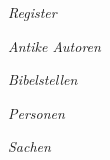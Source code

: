 \emptyEvenPage
\startpart[title={Register}]

\startsetups[b]
  \switchtobodyfont[default]
  \rlap{\pagenumber}
  \hfill
  {\tfx\it Register}
  \hfill
  \llap{}
\stopsetups

 \subject{Antike Autoren}
 
 \startsetups[a]
   \switchtobodyfont[default]
   \rlap{}
   \hfill
   {\tfx\it Antike Autoren}
   \hfill
   \llap{\pagenumber}
 \stopsetups
 
 {\startcolumns
 \placeantIndex
 \stopcolumns}
 
 
 \subject{Bibelstellen}
 
 \startsetups[a]
   \switchtobodyfont[default]
   \rlap{}
   \hfill
   {\tfx\it Bibelstellen}
   \hfill
   \llap{\pagenumber}
 \stopsetups
 
 \startcolumns
 \placebibelIndex
 \stopcolumns

 \subject{Personen}
 
 \startsetups[a]
   \switchtobodyfont[default]
   \rlap{}
   \hfill
   {\tfx\it Personen}
   \hfill
   \llap{\pagenumber}
 \stopsetups
 
 \startcolumns
 \placepersIndex
 \stopcolumns
 
 \subject{Sachen}
 
 \startsetups[a]
   \switchtobodyfont[default]
   \rlap{}
   \hfill
  {\tfx\it Sachen}
   \hfill
   \llap{\pagenumber}
 \stopsetups

 {\startcolumns
 \placesachIndex
 \stopcolumns}

\stoppart
\stoptext
